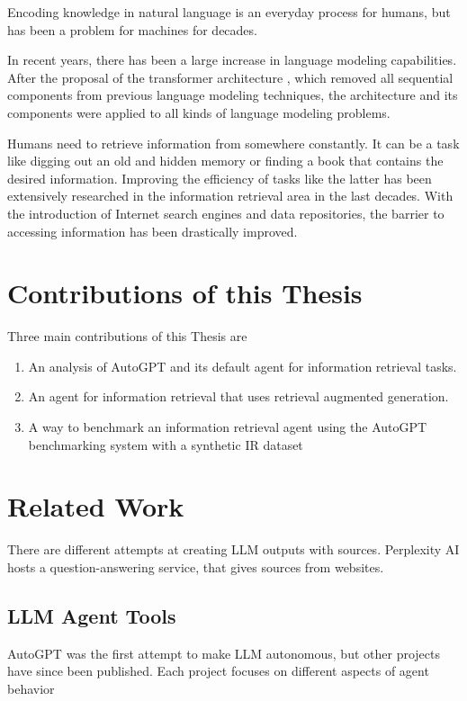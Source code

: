 \documentclass[../main.tex]{subfiles}
\begin{document}
Encoding knowledge in natural language is an everyday process for humans,
but has been a problem for machines for decades.

In recent years, there has been a large increase in language modeling capabilities.
After the proposal of the transformer architecture \cite{Vaswani2017},
which removed all sequential components from previous language modeling techniques,
the architecture and its components were applied to all kinds of language modeling problems.

Humans need to retrieve information from somewhere constantly.
It can be a task like digging out an old and hidden memory or finding a book that contains the desired information.
Improving the efficiency of tasks like the latter has been extensively researched in the information retrieval area in the last decades.
With the introduction of Internet search engines and data repositories, the barrier to accessing information has been drastically improved.

\section{Contributions of this Thesis}

Three main contributions of this Thesis are

\begin{enumerate}
    \item An analysis of AutoGPT and its default agent for information retrieval tasks.
    \item An agent for information retrieval that uses retrieval augmented generation.
    \item A way to benchmark an information retrieval agent using the AutoGPT benchmarking system with a synthetic IR dataset
\end{enumerate}

\section{Related Work}

There are different attempts at creating LLM outputs with sources. Perplexity AI hosts a question-answering service, that gives sources from websites.

\subsection{LLM Agent Tools}

AutoGPT was the first attempt to make LLM autonomous, but other projects have since been published.
Each project focuses on different aspects of agent behavior
\end{document}
